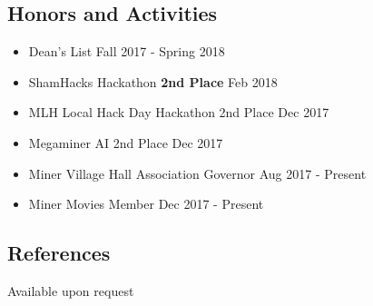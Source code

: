 \documentclass[9pt,oneside]{memoir}
\begin{document}
\vspace*{-4pt}
\subsection*{Honors and Activities}

\begin{itemize}
	\item[] Dean's List
		\hfill Fall 2017 - Spring 2018
		\vspace*{-7pt}
	\item[] ShamHacks Hackathon \textemdash{} \textbf{2nd Place}
		\hfill Feb 2018
		\vspace*{-7pt}
	\item[] MLH Local Hack Day Hackathon \textemdash{} 2nd Place
		\hfill Dec 2017
		\vspace*{-7pt}
	\item[] Megaminer AI \textemdash{} 2nd Place
		\hfill Dec 2017
		\vspace*{-7pt}
	\item[] Miner Village Hall Association \textemdash{} Governor
		\hfill Aug 2017 - Present
		\vspace*{-7pt}
	\item[] Miner Movies \textemdash{} Member
		\hfill Dec 2017 - Present \hspace{1cm}
\end{itemize}


\vspace*{-14pt}
\subsection{References}
\begin{addmargin}[22pt]{0em}
Available upon request
\end{addmargin}
\end{document}
